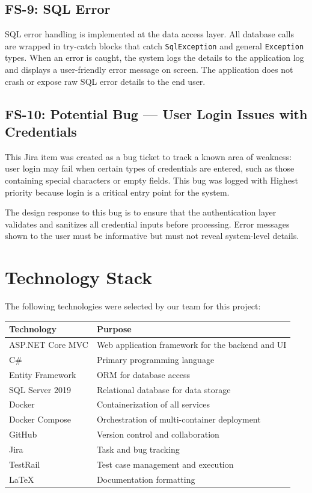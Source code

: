 \documentclass[12pt]{article}
\begin{document}
\subsection{FS-9: SQL Error}
SQL error handling is implemented at the data access layer. All database calls are wrapped
in try-catch blocks that catch \texttt{SqlException} and general \texttt{Exception} types.
When an error is caught, the system logs the details to the application log and displays a
user-friendly error message on screen. The application does not crash or expose raw SQL
error details to the end user.
 
\subsection{FS-10: Potential Bug --- User Login Issues with Credentials}
This Jira item was created as a bug ticket to track a known area of weakness: user login
may fail when certain types of credentials are entered, such as those containing special
characters or empty fields. This bug was logged with Highest priority because login is a
critical entry point for the system.
 
The design response to this bug is to ensure that the authentication layer validates and
sanitizes all credential inputs before processing. Error messages shown to the user must be
informative but must not reveal system-level details.
 
\section{Technology Stack}
 
The following technologies were selected by our team for this project:
 
\begin{center}
\begin{tabular}{ll}
\toprule
Technology & Purpose \\
\midrule
ASP.NET Core MVC & Web application framework for the backend and UI \\
C\# & Primary programming language \\
Entity Framework & ORM for database access \\
SQL Server 2019 & Relational database for data storage \\
Docker & Containerization of all services \\
Docker Compose & Orchestration of multi-container deployment \\
GitHub & Version control and collaboration \\
Jira & Task and bug tracking \\
TestRail & Test case management and execution \\
\LaTeX{} & Documentation formatting \\
\bottomrule
\end{tabular}
\end{center}
 
\end{document}
